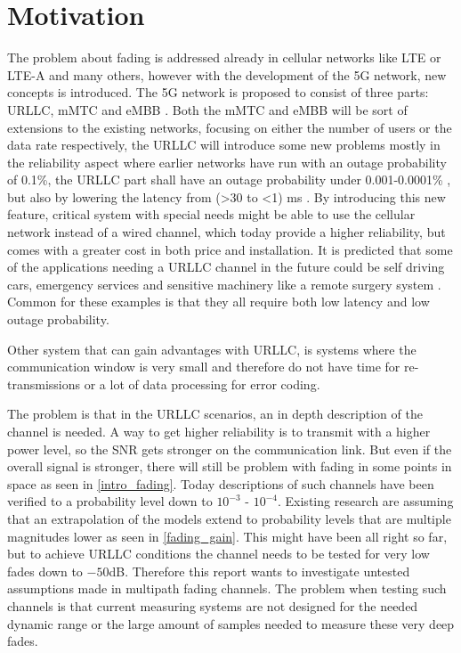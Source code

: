 \section{Motivation}

The problem about fading is addressed already in cellular networks like \gls{LTE} or \gls{LTE-A} and many others, however with the development of the 5G network, new concepts is introduced. The 5G network is proposed to consist of three parts: \Gls{URLLC}, \gls{mMTC} and \gls{eMBB} \citep{5G}. Both the \gls{mMTC} and \gls{eMBB} will be sort of extensions to the existing networks, focusing on either the number of users or the data rate respectively, the \gls{URLLC} will introduce some new problems mostly in the reliability aspect where earlier networks have run with an outage probability of 0.1\%, the URLLC part shall have an outage probability under 0.001-0.0001\% \citep{LTE,Petar5G}, but also by lowering the latency from (>30 to <1) ms \citep{LTE,5G_Latency}. By introducing this new feature, critical system with special needs might be able to use the cellular network instead of a wired channel, which today provide a higher reliability, but comes with a greater cost in both price and installation. It is predicted that some of the applications needing a URLLC channel in the future could be self driving cars, emergency services and sensitive machinery like a remote surgery system \citep{Petar5G}. Common for these examples is that they all require both low latency and low outage probability.

Other system that can gain advantages with URLLC, is systems where the communication window is very small and therefore do not have time for re-transmissions or a lot of data processing for error coding.


The problem is that in the URLLC scenarios, an in depth description of the channel is needed. A way to get higher reliability is to transmit with a higher power level, so the \gls{SNR} gets stronger on the communication link. But even if the overall signal is stronger, there will still be problem with fading in some points in space as seen in \autoref{intro_fading}. Today descriptions of such channels have been verified to a probability level down to $10^{-3}$ - $10^{-4}$. Existing research are assuming that an extrapolation of the models extend to probability levels that are multiple magnitudes lower as seen in \autoref{fading_gain}. This might have been all right so far, but to achieve URLLC conditions the channel needs to be tested for very low fades down to $-50$dB. Therefore this report wants to investigate untested assumptions made in multipath fading channels. The problem when testing such channels is that current measuring systems are not designed for the needed dynamic range or the large amount of samples needed to measure these very deep fades. 

